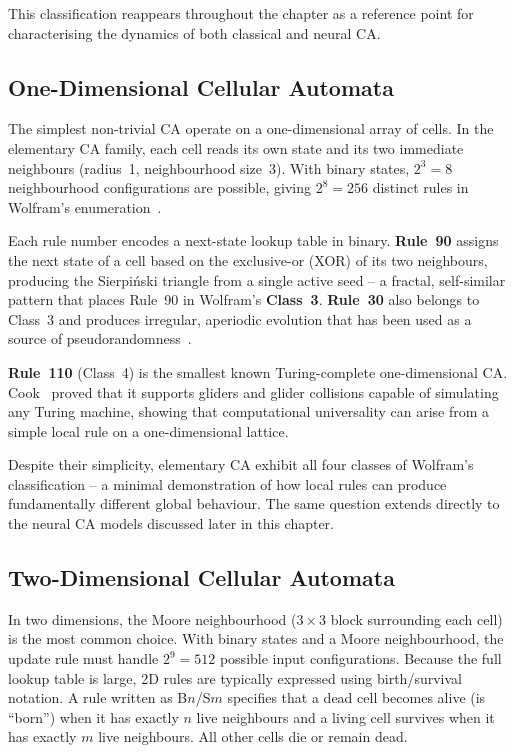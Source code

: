 This classification reappears throughout the chapter as a reference point for
characterising the dynamics of both classical and neural CA.

\subsection{One-Dimensional Cellular Automata}

The simplest non-trivial CA operate on a one-dimensional array of cells. In the
elementary CA family, each cell reads its own state and its two immediate neighbours
(radius~1, neighbourhood size~3). With binary states, $2^{3} = 8$ neighbourhood
configurations are possible, giving $2^{8} = 256$ distinct rules in Wolfram's
enumeration~\cite{Wolfram1983}.

Each rule number encodes a next-state lookup table in binary. \textbf{Rule~90}
assigns the next state of a cell based on the exclusive-or (XOR) of its two
neighbours, producing the Sierpi\'{n}ski triangle from a single active seed --
a fractal, self-similar pattern that places Rule~90 in Wolfram's \textbf{Class~3}.
\textbf{Rule~30} also belongs to Class~3 and produces irregular, aperiodic evolution
that has been used as a source of pseudorandomness~\cite{Wolfram2002}.

\textbf{Rule~110} (Class~4) is the smallest known Turing-complete one-dimensional
CA. Cook~\cite{Cook2004} proved that it supports gliders and glider collisions
capable of simulating any Turing machine, showing that computational universality
can arise from a simple local rule on a one-dimensional lattice.

Despite their simplicity, elementary CA exhibit all four classes of Wolfram's
classification -- a minimal demonstration of how local rules can produce
fundamentally different global behaviour. The same question extends directly to
the neural CA models discussed later in this chapter.

\subsection{Two-Dimensional Cellular Automata}

In two dimensions, the Moore neighbourhood ($3 \times 3$ block surrounding each cell)
is the most common choice. With binary states and a Moore neighbourhood, the update
rule must handle $2^9 = 512$ possible input configurations. Because the full lookup
table is large, 2D rules are typically expressed using birth/survival notation. A rule
written as B$n$/S$m$ specifies that a dead cell becomes alive (is ``born'') when it
has exactly $n$ live neighbours and a living cell survives when it has exactly $m$
live neighbours. All other cells die or remain dead.

